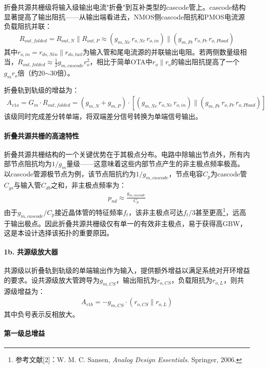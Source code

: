 \documentclass[a4paper, 12pt]{article}
\newcommand{\fnSansen}{\footnote{参考文献[2]：W. M. C. Sansen, \textit{Analog Design Essentials}. Springer, 2006.}}
\begin{document}
折叠共源共栅级将输入级输出电流"折叠"到互补类型的cascode管上。cascode结构显著提高了输出阻抗——从输出端看进去，NMOS侧cascode阻抗和PMOS电流源负载阻抗并联：
\begin{gather}
  R_{out,folded} = R_{out,N} \| R_{out,P}
    \approx (g_{m,Nc} \, r_{o,Nc} \, r_{o,in}) \| (g_{m,Pc} \, r_{o,Pc} \, r_{o,Pload})
\end{gather}
其中$r_{o,in} = r_{ds,Nin} \| r_{ds,tail}$为输入管和尾电流源的并联输出电阻。若两侧数量级相当，$R_{out,folded} \approx \frac{1}{2} g_{m,cascode} r_o^2$，相比于简单OTA中$r_o \| r_o$的输出阻抗提高了一个$g_m r_o$倍（约20$\sim$30倍）。

折叠轨到轨级的增益为：
\begin{gather}
  A_{v1a} = G_m \cdot R_{out,folded}
    = (g_{m,N} + g_{m,P}) \cdot \left[
      (g_{m,Nc} \, r_{o,Nc} \, r_{o,in}) \| (g_{m,Pc} \, r_{o,Pc} \, r_{o,Pload})
    \right]
\end{gather}
该级同时完成差分转单端，将双端差分信号转换为单端信号输出。

\paragraph{折叠共源共栅的高速特性}

折叠共源共栅结构的一个关键优势在于其极点分布。电路中除输出节点外，所有内部节点阻抗均为$1/g_m$量级——这意味着这些内部节点产生的非主极点频率极高。以cascode管源极节点为例，该节点阻抗约为$1/g_{m,cascode}$，节点电容$C_p$为cascode管$C_{gs}$与输入管$C_{db}$之和，非主极点频率为：
\begin{gather}
  p_{nd} \approx \frac{g_{m,cascode}}{C_p}
\end{gather}
由于$g_{m,cascode}/C_p$接近晶体管的特征频率$f_t$，该非主极点可达$f_t/3$甚至更高\fnSansen，远高于输出极点。因此折叠共源共栅级仅有单一的有效非主极点，易于获得高GBW，这是本设计选择该拓扑的重要原因。

\paragraph{1b. 共源级放大器}

共源级以折叠轨到轨级的单端输出作为输入，提供额外增益以满足系统对开环增益的要求。设共源级放大管跨导为$g_{m,CS}$，输出阻抗为$r_{o,CS}$，负载阻抗为$r_{o,L}$，则共源级增益为：
\begin{gather}
  A_{v1b} = -g_{m,CS} \cdot (r_{o,CS} \| r_{o,L})
\end{gather}
其中负号表示反相放大。

\paragraph{第一级总增益}
\end{document}
